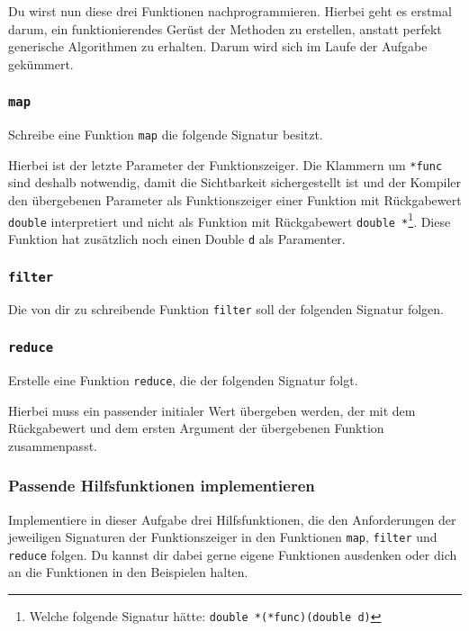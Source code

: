 Du wirst nun diese drei Funktionen nachprogrammieren.
Hierbei geht es erstmal darum, ein funktionierendes Gerüst der Methoden zu erstellen, anstatt perfekt generische Algorithmen zu erhalten.
Darum wird sich im Laufe der Aufgabe gekümmert.

\subsubsection{\lstinline{map}}

Schreibe eine Funktion \lstinline{map} die folgende Signatur besitzt.



Hierbei ist der letzte Parameter der Funktionszeiger.
Die Klammern um \lstinline{*func} sind deshalb notwendig, damit die Sichtbarkeit sichergestellt ist und der Kompiler den übergebenen Parameter als Funktionszeiger einer Funktion mit Rückgabewert \lstinline{double} interpretiert und nicht als Funktion mit Rückgabewert \lstinline{double *}\footnote{Welche folgende Signatur hätte: \lstinline{double *(*func)(double d)}}.
Diese Funktion hat zusätzlich noch einen Double \lstinline{d} als Paramenter.

\subsubsection{\lstinline{filter}}

Die von dir zu schreibende Funktion \lstinline{filter} soll der folgenden Signatur folgen.



\subsubsection{\lstinline{reduce}}

Erstelle eine Funktion \lstinline{reduce}, die der folgenden Signatur folgt.



Hierbei muss ein passender initialer Wert übergeben werden, der mit dem Rückgabewert und dem ersten Argument der übergebenen Funktion zusammenpasst.

\subsubsection{Passende Hilfsfunktionen implementieren}
Implementiere in dieser Aufgabe drei Hilfsfunktionen, die den Anforderungen der jeweiligen Signaturen der Funktionszeiger in den Funktionen \lstinline{map}, \lstinline{filter} und \lstinline{reduce} folgen.
Du kannst dir dabei gerne eigene Funktionen ausdenken oder dich an die Funktionen in den Beispielen halten. 

